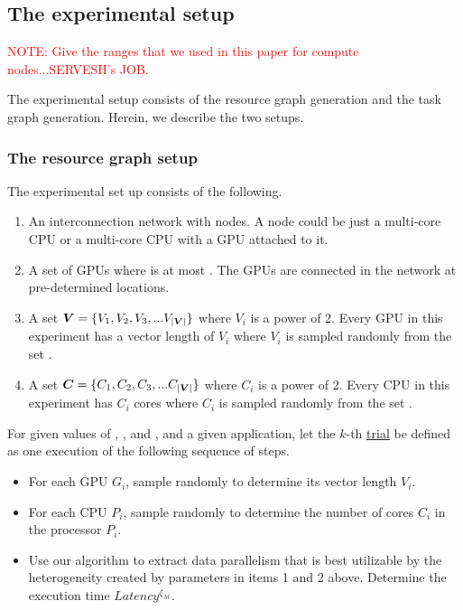 \subsection{The experimental setup}
\label{sec:experimental-setup}

\textcolor{red}{NOTE: Give the ranges that we used in this paper for compute
nodes...SERVESH's JOB.}

The experimental setup consists of the resource graph generation and the
task graph generation. Herein, we describe the two setups.

\subsubsection{The resource graph setup}
\label{sec:resource-graph-setup}

The experimental set up consists of the following.

\begin{enumerate}

\item  An interconnection network with \numtplgynodes nodes. A node 
could be just a multi-core CPU or a multi-core CPU with a GPU attached to it.

\item A set of \gpunum GPUs where \gpunum is at most \numtplgynodes. The GPUs
are connected in the network at pre-determined locations.

\item A set $\bm{V} = \{V_1, V_2, V_3, ... V_{|\bm{V}|}\}$ where $V_i$
is a power of 2.  Every GPU in this experiment has a vector length of $V_i$
where $V_i$ is sampled randomly from the set \veclenset.

\item A set $\bm{C} = \{C_1, C_2, C_3, ... C_{|\bm{V}|}\}$ where $C_i$
is a power of 2.  Every CPU in this experiment has $C_i$
cores where $C_i$ is sampled randomly from the set \corenumset.

\end{enumerate}

For given values of \numtplgynodes, \gpunum, \veclenset and \corenumset,
and a given application, let the $k$-th \ul{trial} be defined as one
execution of the following sequence of steps.

\begin{itemize}

\item For each GPU $G_i$, sample \veclenset 
randomly to determine its vector length $V_i$. \label{i1}

\item For each CPU $P_i$, sample \corenumset randomly to determine the
  number of cores $C_i$ in the processor $P_i$.~\label{i2}

\item Use our algorithm to extract data parallelism that is best
  utilizable by the heterogeneity created by parameters in items 1 and 2
  above. Determine the execution time $Latency^{\zeta_\mathcal{M}}$.

\end{itemize}


